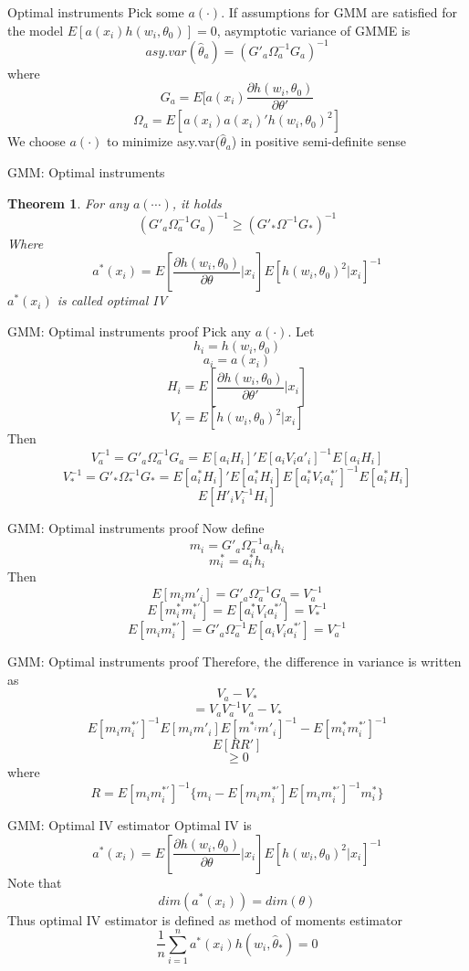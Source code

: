 \documentclass{beamer}
\newtheorem{thm}{Theorem}[subsection]
\begin{document}
\begin{frame}{Optimal instruments}
	Pick some $a(\cdot)$. If assumptions for GMM are satisfied for the model $E[a(x_i) h(w_i,\theta_0)]=0$, asymptotic variance of GMME is 
	\[asy.var(\hat{\theta}_a) = (G'_a \Omega^{-1}_a G_a)^{-1}\]
	where
	\[G_a = E[a(x_i) \frac{\partial h(w_i,\theta_0)}{\partial \theta'}\]
		\[\Omega_a = E[a(x_i) a(x_i)' h(w_i,\theta_0)^2]\]
		We choose $a(\cdot)$ to minimize asy.var($\hat{\theta}_a$) in positive semi-definite sense
\end{frame}
\begin{frame}{GMM: Optimal instruments}
	\begin{thm}
		For any $a(\cdots)$, it holds
		\[(G'_a \Omega^{-1}_a G_a)^{-1} \geq (G'_* \Omega^{-1} G_*)^{-1}\]
		Where
		\[a^*(x_i) = E[\frac{\partial h(w_i,\theta_0)}{\partial \theta}|x_i]E[h(w_i,\theta_0)^2|x_i]^{-1}\]
		$a^*(x_i)$ is called optimal IV
	\end{thm}
\end{frame}
\begin{frame}{GMM: Optimal instruments proof}
	Pick any $a(\cdot)$. Let 
	\[h_i = h(w_i,\theta_0)\]
	\[a_i = a(x_i)\]
	\[H_i = E[\frac{\partial h(w_i,\theta_0)}{\partial \theta'}|x_i]\]
	\[V_i = E[h(w_i,\theta_0)^2|x_i]\]
	Then
	\[V^{-1}_a = G'_a \Omega^{-1}_a G_a = E[a_i H_i]' E[a_i V_i a'_i]^{-1} E[a_i H_i]\]
	\[V^{-1}_* = G'_* \Omega^{-1}_{*} G_* = E[a^{*}_i H_i]' E[a^{*}_i H_i] E[a^{*}_i V_i a^{*'}_i]^{-1}E[a^{*}_i H_i]\]
	\[E[H'_i V^{-1}_i H_i]\]
\end{frame}
\begin{frame}{GMM: Optimal instruments proof}
	Now define
	\[m_i = G'_a \Omega^{-1}_a a_i h_i\]
	\[m^*_i = a^*_i h_i\]
	Then 
	\[E[m_i m'_i] = G'_a \Omega^{-1}_a G_a = V^{-1}_a\]
	\[E[m^*_i m^{*'}_i] = E[a^*_i V_i a^{*'}_i] = V^{-1}_*\]
	\[E[m_i m^{*'}_i ] = G'_a \Omega^{-1}_a E[a_i V_i a^{*'}_i] = V^{-1}_a\]
\end{frame}
\begin{frame}{GMM: Optimal instruments proof}
	Therefore, the difference in variance is written as
	\[V_a - V_* \]
	\[= V_aV^{-1}_aV_a - V_*\]
	\[E[m_i m^{*'}_i ]^{-1} E[m_i m'_i]E[m^{*_i} m'_i ]^{-1} - E[m^*_im^{*'}_i]^{-1}\]
	\[E[RR']\]
	\[\geq 0\]
	where
	\[R =E[m_i m^{*'}_i ]^{-1} \{m_i - E[m_i m^{*'}_i ] E[m_i m^{*'}_i ]^{-1} m^*_i\}\]
\end{frame}
\begin{frame}{GMM: Optimal IV estimator}
	Optimal IV is 
	\[a^*(x_i) = E[\frac{\partial h(w_i,\theta_0)}{\partial \theta}|x_i] E[h(w_i,\theta_0)^2|x_i]^{-1}\]
	Note that 
	\[dim(a^*(x_i)) = dim(\theta)\]
	Thus optimal IV estimator is defined as method of moments estimator
	\[\frac{1}{n} \sum^n_{i=1} a^*(x_i)h(w_i,\hat{\theta}_*) = 0\]
\end{frame}
\end{document}
